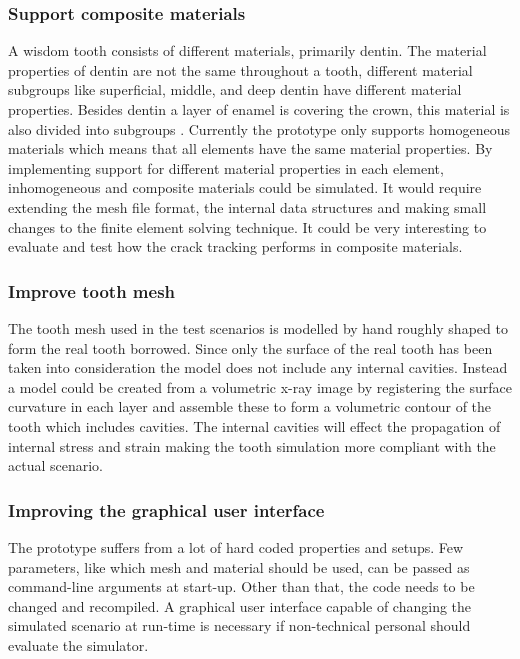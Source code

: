 \subsubsection*{Support composite materials}
A wisdom tooth consists of different materials, primarily dentin.
The material properties of dentin are not the same throughout a tooth,
different material subgroups like superficial, middle,
and deep dentin have different material properties.
%
Besides dentin a layer of enamel is covering the crown, this material
is also divided into subgroups .
%
Currently the prototype only supports homogeneous materials which
means that all elements have the same material properties. By
implementing support for different material properties in each element,
inhomogeneous and composite materials could be simulated. It would
require extending the mesh file format, the internal data structures
and making small changes to the finite element solving technique. It
could be very interesting to evaluate and test how the crack tracking
performs in composite materials.


\subsubsection*{Improve tooth mesh}
The tooth mesh used in the test scenarios is modelled by hand roughly
shaped to form the real tooth borrowed. Since only the surface of the
real tooth has been taken into consideration the model does not
include any internal cavities. Instead a model could be created from
a volumetric x-ray image by registering the surface curvature in each
layer and assemble these to form a volumetric contour of the tooth which
includes cavities. The internal cavities will effect the propagation
of internal stress and strain making the tooth simulation more
compliant with the actual scenario.


\subsubsection*{Improving the graphical user interface}
The prototype suffers from a lot of hard coded properties and
setups. Few parameters, like which mesh and material should be used,
can be passed as command-line arguments at start-up. Other than that, the
code needs to be changed and recompiled. A graphical user interface capable
of changing the simulated scenario at run-time is necessary if
non-technical personal should evaluate the simulator.



